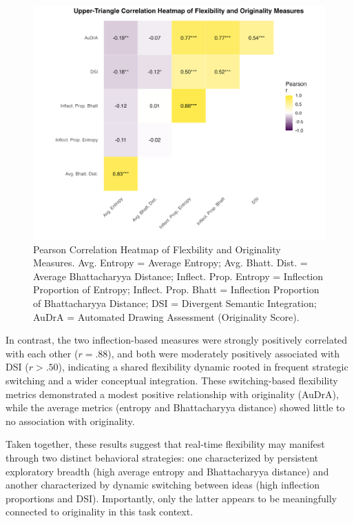 \documentclass[../MA_Thesis.tex]{subfiles}
\begin{document}
\begin{figure}[H]
  \centering
  \includegraphics[width=\textwidth]{../analysis/results/main_results/correlation/correlation_heatmap.png}
  \caption{
    Pearson Correlation Heatmap of Flexbility and Originality Measures. Avg. Entropy = Average Entropy; Avg. Bhatt. Dist. = Average Bhattacharyya Distance; Inflect. Prop. Entropy = Inflection Proportion of Entropy; Inflect. Prop. Bhatt = Inflection Proportion of Bhattacharyya Distance; DSI = Divergent Semantic Integration; AuDrA = Automated Drawing Assessment (Originality Score).
  }
  \label{fig:cor_heatmap}
\end{figure}

In contrast, the two inflection-based measures were strongly positively correlated with each other ($r = .88$), and both were moderately positively associated with DSI ($r > .50$), indicating a shared flexibility dynamic rooted in frequent strategic switching and a wider conceptual integration. These switching-based flexibility metrics demonstrated a modest positive relationship with originality (AuDrA), while the average metrics (entropy and Bhattacharyya distance) showed little to no association with originality.

Taken together, these results suggest that real-time flexibility may manifest through two distinct behavioral strategies: one characterized by persistent exploratory breadth (high average entropy and Bhattacharyya distance) and another characterized by dynamic switching between ideas (high inflection proportions and DSI). Importantly, only the latter appears to be meaningfully connected to originality in this task context.
\end{document}
